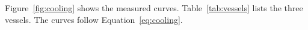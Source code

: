 Figure~\ref{fig:cooling} shows the measured curves.
Table~\ref{tab:vessels} lists the three vessels.
The curves follow Equation~\eqref{eq:cooling}.
